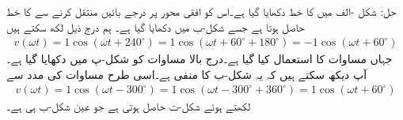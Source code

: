 حل: شکل -الف میں  کا خط دکھایا گیا ہے۔اس کو افقی محور پر  درجے  بائیں منتقل کرنے سے  کا خط حاصل ہوتا ہے جسے شکل-ب میں دکھایا گیا ہے۔ ہم درج ذیل لکھ سکتے ہیں
\begin{align*}
v(\omega t)=1\cos (\omega t +240^{\circ})=1\cos (\omega t +60^{\circ}+180^{\circ})=-1\cos (\omega t +60^{\circ})
\end{align*}
جہاں مساوات  کا استعمال کیا گیا ہے۔درج بالا مساوات کو شکل-پ میں دکھایا گیا ہے۔آپ دیکھ سکتے ہیں کہ یہ شکل-ب کا منفی ہے۔اسی طرح مساوات  کی مدد سے
\begin{align*}
v(\omega t)=1\cos(\omega t-300^{\circ})=1\cos(\omega t-300^{\circ}+360^{\circ})=1\cos(\omega t+60^{\circ})
\end{align*}
لکھتے ہوئے شکل-ت حاصل ہوتی ہے جو عین شکل-ب ہی ہے۔
